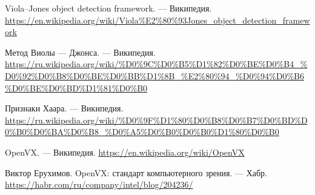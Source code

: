 \documentclass[12pt,a4paper]{scrartcl}
\begin{document}
\begin{thebibliography}{9}
	Viola–Jones object detection framework.
	\newblock --- Википедия. \url{https://en.wikipedia.org/wiki/Viola%E2%80%93Jones_object_detection_framework}
		
	Метод Виолы — Джонса.
	\newblock --- Википедия. \url{https://ru.wikipedia.org/wiki/%D0%9C%D0%B5%D1%82%D0%BE%D0%B4_%D0%92%D0%B8%D0%BE%D0%BB%D1%8B_%E2%80%94_%D0%94%D0%B6%D0%BE%D0%BD%D1%81%D0%B0}
		
	Признаки Хаара.
	\newblock --- Википедия. \url{https://ru.wikipedia.org/wiki/%D0%9F%D1%80%D0%B8%D0%B7%D0%BD%D0%B0%D0%BA%D0%B8_%D0%A5%D0%B0%D0%B0%D1%80%D0%B0}
		
	OpenVX.
	\newblock --- Википедия. \url{https://en.wikipedia.org/wiki/OpenVX}		
	
	Виктор Ерухимов. OpenVX: стандарт компьютерного зрения.
	\newblock --- Хабр. \url{https://habr.com/ru/company/intel/blog/204236/}
	
	
\end{thebibliography}
\end{document}
